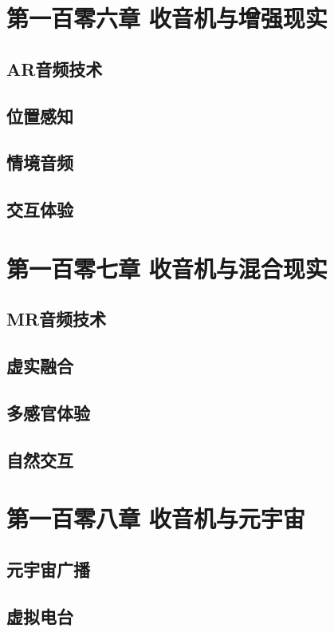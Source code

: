 \documentclass[12pt,UTF8]{ctexbook}
\begin{document}
\chapter{第一百零六章 收音机与增强现实}

\section{AR音频技术}
\section{位置感知}
\section{情境音频}
\section{交互体验}

\chapter{第一百零七章 收音机与混合现实}

\section{MR音频技术}
\section{虚实融合}
\section{多感官体验}
\section{自然交互}

\chapter{第一百零八章 收音机与元宇宙}

\section{元宇宙广播}
\section{虚拟电台}
\end{document}
